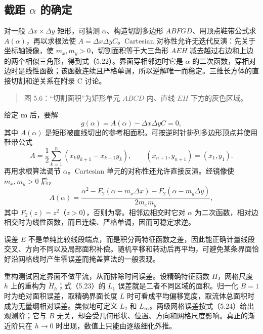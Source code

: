 \documentclass[11pt,a4paper,openany,fontset=none]{ctexbook}
\begin{document}
\subsection{\texorpdfstring{截距 $\alpha$ 的确定}{截距 alpha 的确定}}

对一般 $\Delta x\times\Delta y$ 矩形，可猜测 $\alpha$、构造切割多边形 $ABFGD$、用顶点鞋带公式求 $A(\alpha)$，再以求根法使 $A=\Delta x\Delta yC$。Cartesian 对称性允许无迭代反演：先关于坐标轴镜像，使 $m_x,m_y>0$，切割面积等于大三角形 $AEH$ 减去越过右边和上边的两个相似三角形，得到式（5.22）。界面穿相邻边时它是 $\alpha$ 的二次函数，穿相对边时是线性函数；该函数连续且严格单调，所以逆解唯一而稳定。三维长方体的直接切割和逆关系在附录 C 讨论。

\begin{quote}\small 图 5.6：“切割面积”为矩形单元 $ABCD$ 内、直线 $EH$ 下方的灰色区域。\end{quote}
给定 $\bm m$ 后，要解
\begin{equation}
g(\alpha)=A(\alpha)-\Delta x\Delta y C=0,
\tag{5.20}
\end{equation}
其中 $A(\alpha)$ 是矩形被直线切出的参考相面积。可按逆时针排列多边形顶点并使用鞋带公式
\begin{equation}
A=\frac12\sum_{k=1}^{n}(x_ky_{k+1}-x_{k+1}y_k),
\qquad (x_{n+1},y_{n+1})=(x_1,y_1).
\tag{5.21}
\end{equation}
再用求根算法调节 $\alpha$。Cartesian 单元的对称性还允许直接反演。经镜像使 $m_x,m_y>0$ 后，
\begin{equation}
A(\alpha)=\frac{\alpha^2-F_2(\alpha-m_x\Delta x)-F_2(\alpha-m_y\Delta y)}{2m_xm_y},
\tag{5.22}
\end{equation}
其中 $F_2(z)=z^2$（$z>0$），否则为零。相邻边相交时它对 $\alpha$ 为二次函数，相对边相交时为线性函数，而且连续、严格单调，因而可稳定求逆。

误差 $E$ 不是单纯比较线段端点，而是积分两特征函数之差，因此能正确计量线段交叉、方向不同以及局部面积补偿。随机平移和转动后再平均，可避免某条界面恰好沿网格线时产生零误差而掩盖算法的一般表现。

重构测试固定界面不做平流，从而排除时间误差。设精确特征函数 $H$，网格尺度 $h$ 上的重构为 $\widetilde H_h$；式（5.23）的 $L_1$ 误差就是二者不同区域的面积。归一化 $B=1$ 时为绝对面积误差，取精确界面长度 $L$ 时可看成平均偏移宽度，取流体总面积时成为无量纲相对误差。类似地可定义 $L_2$ 和 $L_\infty$。两级网格误差按式（5.24）给出观测阶；它与 $B$ 无关，却会受几何形状、位置、方向和网格尺度影响。真正的渐近阶只在 $h\to0$ 时出现，数值上只能由逐级细化外推。
\end{document}
